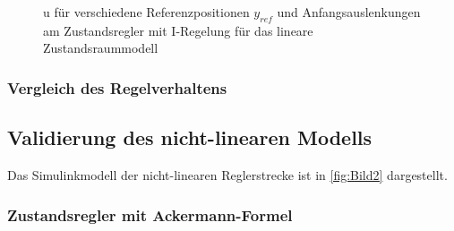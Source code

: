 \documentclass[
	pagesize,
	fontsize=12pt,
	paper=a4,
	oneside,
   reqno
]{scrartcl}
\begin{document}
\begin{figure}[H]
    \centering
    \caption[u für Regler mit I-Regelung (linear)]{u für verschiedene Referenzpositionen $y_{ref}$ und Anfangsauslenkungen am Zustandsregler mit I-Regelung für das lineare Zustandsraummodell}
    \label{fig:Bild20}
\end{figure}

\subsubsection{Vergleich des Regelverhaltens}

\subsection{Validierung des nicht-linearen Modells}

Das Simulinkmodell der nicht-linearen Reglerstrecke ist in \autoref{fig:Bild2} dargestellt.

\subsubsection{Zustandsregler mit Ackermann-Formel}
\end{document}
